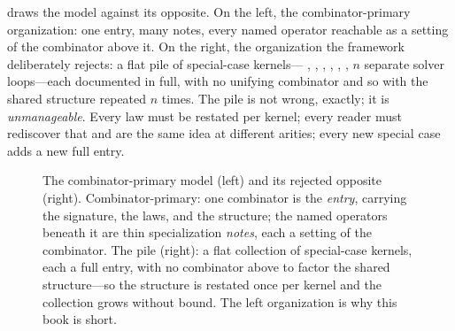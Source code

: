  draws the model against its opposite. On the left, the
combinator-primary organization: one entry, many notes, every named operator
reachable as a setting of the combinator above it. On the right, the organization
the framework deliberately rejects: a flat pile of special-case kernels---
, , , , , ,
$n$ separate solver loops---each documented in full, with no unifying combinator
and so with the shared structure repeated $n$ times. The pile is not wrong, exactly;
it is \emph{unmanageable}. Every law must be restated per kernel; every reader must
rediscover that  and  are the same idea at different
arities; every new special case adds a new full entry.

\begin{figure}[t]
\centering
{}
\caption[The combinator-primary model versus the pile]{The combinator-primary
model (left) and its rejected opposite (right). Combinator-primary: one combinator
is the \emph{entry}, carrying the signature, the laws, and the structure; the named
operators beneath it are thin specialization \emph{notes}, each a setting of the
combinator. The pile (right): a flat collection of special-case kernels, each a
full entry, with no combinator above to factor the shared structure---so the
structure is restated once per kernel and the collection grows without bound. The
left organization is why this book is short.}
\label{fig:primary}
\end{figure}

